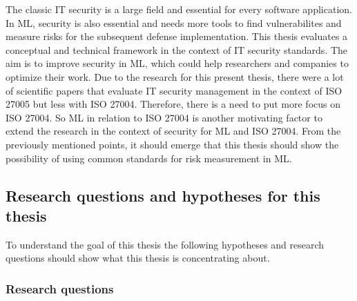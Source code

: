 The classic IT security is a large field and essential for every software application. In ML, security is also essential and needs more tools to find vulnerabilites and measure risks for
the subsequent defense implementation. This thesis evaluates a conceptual and technical framework in the context of IT security standards. The aim is to improve security in ML, which could
help researchers and companies to optimize their work. Due to the research for this present thesis, there were a lot of scientific papers that evaluate IT security management in the
context of ISO 27005 but less with ISO 27004. Therefore, there is a need to put more focus on ISO 27004. So ML in relation to ISO 27004 is another motivating factor to extend the research
in the context of security for ML and ISO 27004. From the previously mentioned points, it should emerge that this thesis should show the possibility of using common standards for risk
measurement in ML.

\subsection{Research questions and hypotheses for this thesis}


To understand the goal of this thesis the following hypotheses and research questions should show what this thesis is concentrating about.

\subsubsection*{Research questions}

